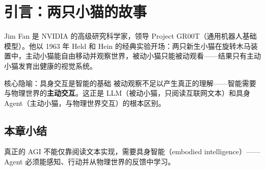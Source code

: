 \section{引言：两只小猫的故事}

Jim Fan 是 NVIDIA 的高级研究科学家，领导 Project GR00T（通用机器人基础模型）。他以 1963 年 Held 和 Hein 的经典实验开场：两只新生小猫在旋转木马装置中，主动小猫能自由移动并观察世界，被动小猫只能被动观看——结果只有主动小猫发育出健康的视觉系统。

\begin{importantbox}{核心隐喻：具身交互是智能的基础}
被动观察不足以产生真正的理解——智能需要与物理世界的\textbf{主动交互}。这正是 LLM（被动小猫，只阅读互联网文本）和具身 Agent（主动小猫，与物理世界交互）的根本区别。
\end{importantbox}

\subsection{本章小结}

真正的 AGI 不能仅靠阅读文本实现，需要具身智能（embodied intelligence）——Agent 必须能感知、行动并从物理世界的反馈中学习。

